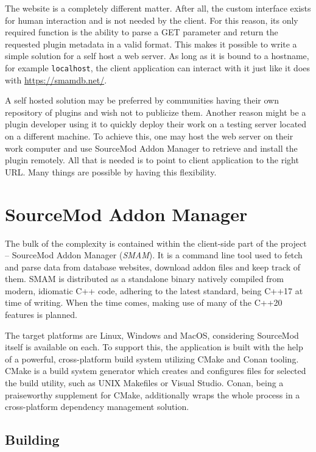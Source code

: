 The website is a completely different matter.
After all, the custom interface exists for human interaction and is not needed by the client.
For this reason, its only required function is the ability to parse a GET parameter and return the requested plugin metadata in a valid format.
This makes it possible to write a simple solution for a self host a web server.
As long as it is bound to a hostname, for example \verb|localhost|, the client application can interact with it just like it does with \url{https://smamdb.net/}.

A self hosted solution may be preferred by communities having their own repository of plugins and wish not to publicize them.
Another reason might be a plugin developer using it to quickly deploy their work on a testing server located on a different machine.
To achieve this, one may host the web server on their work computer and use SourceMod Addon Manager to retrieve and install the plugin remotely.
All that is needed is to point to client application to the right URL\@.
Many things are possible by having this flexibility.

\section{SourceMod Addon Manager}

The bulk of the complexity is contained within the client-side part of the project -- SourceMod Addon Manager (\textit{SMAM}).
It is a command line tool used to fetch and parse data from database websites, download addon files and keep track of them.
SMAM is distributed as a standalone binary natively compiled from modern, idiomatic C++ code, adhering to the latest standard, being C++17 at time of writing.
When the time comes, making use of many of the C++20 features is planned.

The target platforms are Linux, Windows and MacOS, considering SourceMod itself is available on each.
To support this, the application is built with the help of a powerful, cross-platform build system utilizing CMake and Conan tooling.
CMake is a build system generator which creates and configures files for selected the build utility, such as UNIX Makefiles or Visual Studio.
Conan, being a praiseworthy supplement for CMake, additionally wraps the whole process in a cross-platform dependency management solution.

\subsection{Building}

